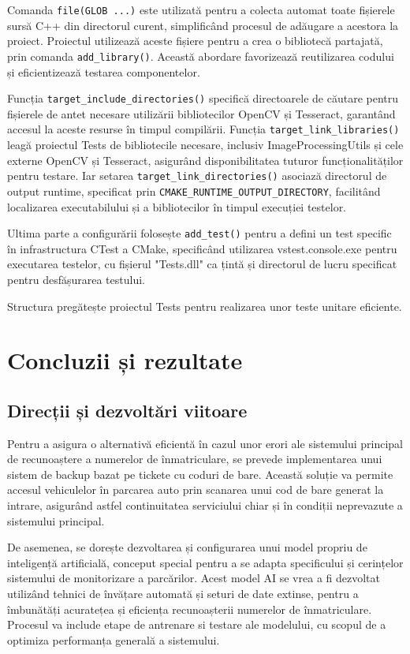 \documentclass[a4paper,12pt]{report}
\begin{document}
Comanda \texttt{file(GLOB ...)} este utilizată pentru a colecta automat toate fișierele sursă C++ din directorul curent, simplificând procesul de adăugare a acestora la proiect. Proiectul utilizează aceste fișiere pentru a crea o bibliotecă partajată, prin comanda \texttt{add\_library()}. Această abordare favorizează reutilizarea codului și eficientizează testarea componentelor.

Funcția \texttt{target\_include\_directories()} specifică directoarele de căutare pentru fișierele de antet necesare utilizării bibliotecilor OpenCV și Tesseract, garantând accesul la aceste resurse în timpul compilării. Funcția  \texttt{target\_link\_libraries()} leagă proiectul Tests de bibliotecile necesare, inclusiv ImageProcessingUtils și cele externe OpenCV și Tesseract, asigurând disponibilitatea tuturor funcționalităților pentru testare. Iar setarea \texttt{target\_link\_directories()} asociază directorul de output runtime, specificat prin \texttt{CMAKE\_RUNTIME\_OUTPUT\_DIRECTORY}, facilitând localizarea executabilului și a bibliotecilor în timpul execuției testelor.

Ultima parte a configurării folosește \texttt{add\_test()} pentru a defini un test specific în infrastructura CTest a CMake, specificând utilizarea vstest.console.exe pentru executarea testelor, cu fișierul "Tests.dll" ca țintă și directorul de lucru specificat pentru desfășurarea testului.

Structura pregătește proiectul Tests pentru realizarea unor teste unitare eficiente.

\chapter{Concluzii și rezultate}
\section{Direcții și dezvoltări viitoare}
Pentru a asigura o alternativă eficientă în cazul unor erori ale sistemului principal de recunoaștere a numerelor de înmatriculare, se prevede implementarea unui sistem de backup bazat pe tickete cu coduri de bare. Această soluție va permite accesul vehiculelor în parcarea auto prin scanarea unui cod de bare generat la intrare, asigurând astfel continuitatea serviciului chiar și în condiții neprevazute a sistemului principal.

De asemenea, se dorește dezvoltarea și configurarea unui model propriu de inteligență artificială, conceput special pentru a se adapta specificului și cerințelor sistemului de monitorizare a parcărilor. Acest model AI se vrea a fi dezvoltat utilizând tehnici de învățare automată și seturi de date extinse, pentru a îmbunătăți acuratețea și eficiența recunoașterii numerelor de înmatriculare. Procesul va include etape de antrenare si testare ale modelului, cu scopul de a optimiza performanța generală a sistemului.
\end{document}
